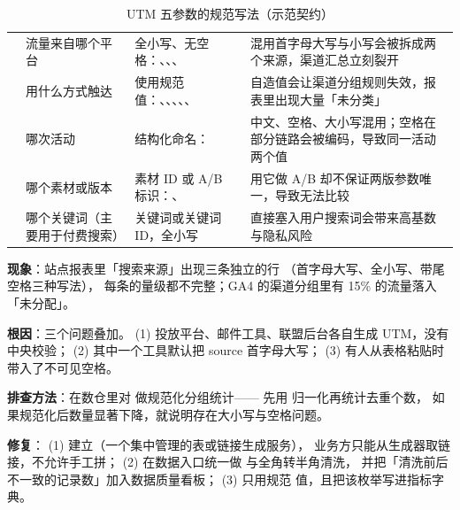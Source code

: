 \begin{table}[htbp]
\centering
\caption{UTM 五参数的规范写法（示范契约）}
\label{tab:growth-utm}
\small
\begin{tabularx}{\textwidth}{L{2.4cm} L{2.5cm} L{4.1cm} Y}
\toprule
{} &  &  &  \\
\midrule
{} & 流量来自哪个平台 & 全小写、无空格：、、、 & 混用首字母大写与小写会被拆成两个来源，渠道汇总立刻裂开 \\
\addlinespace
{} & 用什么方式触达 & 使用规范值：、、、、、 & 自造值会让渠道分组规则失效，报表里出现大量「未分类」 \\
\addlinespace
{} & 哪次活动 & 结构化命名： & 中文、空格、大小写混用；空格在部分链路会被编码，导致同一活动两个值 \\
\addlinespace
{} & 哪个素材或版本 & 素材 ID 或 A/B 标识：、 & 用它做 A/B 却不保证两版参数唯一，导致无法比较 \\
\addlinespace
{} & 哪个关键词（主要用于付费搜索） & 关键词或关键词 ID，全小写 & 直接塞入用户搜索词会带来高基数与隐私风险 \\
\bottomrule
\end{tabularx}
\end{table}

\begin{pitfall}
\textbf{现象}：站点报表里「搜索来源」出现三条独立的行
（首字母大写、全小写、带尾空格三种写法），
每条的量级都不完整；GA4 的渠道分组里有 15\% 的流量落入「未分配」。

\textbf{根因}：三个问题叠加。
(1) 投放平台、邮件工具、联盟后台各自生成 UTM，没有中央校验；
(2) 其中一个工具默认把 source 首字母大写；
(3) 有人从表格粘贴时带入了不可见空格。

\textbf{排查方法}：在数仓里对  做规范化分组统计——
先用  归一化再统计去重个数，
如果规范化后数量显著下降，就说明存在大小写与空格问题。

\textbf{修复}：
(1) 建立（一个集中管理的表或链接生成服务），
业务方只能从生成器取链接，不允许手工拼；
(2) 在数据入口统一做  与全角转半角清洗，
并把「清洗前后不一致的记录数」加入数据质量看板；
(3) 只用规范  值，且把该枚举写进指标字典。
\end{pitfall}

